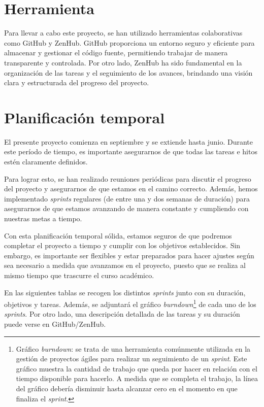 \section{Herramienta}
Para llevar a cabo este proyecto, se han utilizado herramientas colaborativas como GitHub y ZenHub. GitHub proporciona un entorno seguro y eficiente para almacenar y gestionar el código fuente, permitiendo trabajar de manera transparente y controlada. Por otro lado, ZenHub ha sido fundamental en la organización de las tareas y el seguimiento de los avances, brindando una visión clara y estructurada del progreso del proyecto.  

\section{Planificación temporal}
El presente proyecto comienza en septiembre y se extiende hasta junio. Durante este período de tiempo, es importante asegurarnos de que todas las tareas e hitos estén claramente definidos.

Para lograr esto, se han realizado reuniones periódicas para discutir el progreso del proyecto y asegurarnos de que estamos en el camino correcto. Además, hemos implementado \textit{sprints} regulares (de entre una y dos semanas de duración) para asegurarnos de que estamos avanzando de manera constante y cumpliendo con nuestras metas a tiempo.

Con esta planificación temporal sólida, estamos seguros de que podremos completar el proyecto a tiempo y cumplir con los objetivos establecidos. Sin embargo, es importante ser flexibles y estar preparados para hacer ajustes según sea necesario a medida que avanzamos en el proyecto, puesto que se realiza al mismo tiempo que trascurre el curso académico.

En las siguientes tablas se recogen los distintos \textit{sprints} junto con su duración, objetivos y tareas. Además, se adjuntará el gráfico \textit{burndown}\footnote{Gráfico \textit{burndown}: se trata de una herramienta comúnmente utilizada en la gestión de proyectos ágiles para realizar un seguimiento de un \textit{sprint}. Este gráfico muestra la cantidad de trabajo que queda por hacer en relación con el tiempo disponible para hacerlo. A medida que se completa el trabajo, la línea del gráfico debería disminuir hasta alcanzar cero en el momento en que finaliza el \textit{sprint}.} de cada uno de los \textit{sprints}. Por otro lado, una descripción detallada de las tareas y su duración puede verse en GitHub/ZenHub.

